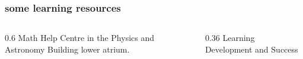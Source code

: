 \documentclass[aspectratio=169, 12pt]{beamer}
\begin{document}
\begin{frame} \frametitle{some learning resources}
  \medskip
  \begin{columns}[t]
    \begin{column}{0.6\textwidth}
      \centering
      Math Help Centre in the Physics and Astronomy Building lower atrium.

      \smallskip
    \end{column}
    \begin{column}{0.36\textwidth}
      \centering
      Learning Development and Success

      \smallskip
    \end{column}
  \end{columns}
\end{frame}
\end{document}
